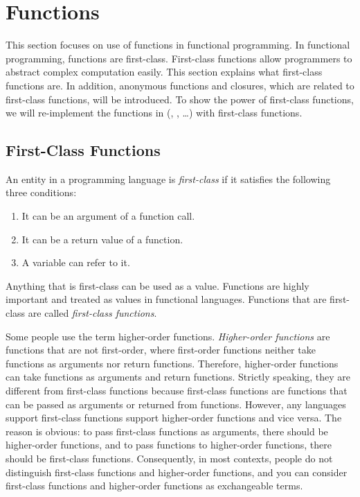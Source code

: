 \setchapterpreamble[u]{\margintoc}
\chapter{Functions}

This section focuses on use of functions in functional programming.
In functional programming, functions are first-class. First-class functions
allow programmers to abstract complex computation easily.
This section explains what first-class functions are.
In addition, anonymous functions and closures, which are related to first-class
functions, will be introduced. To show the power of first-class functions, we
will re-implement the functions in  (,
, \ldots) with first-class functions.

\section{First-Class Functions}

An entity in a programming language is \textit{first-class} if it satisfies the
following three conditions:

\begin{enumerate}
\item It can be an argument of a function call.
\item It can be a return value of a function.
\item A variable can refer to it.
\end{enumerate}

Anything that is first-class can be used as a value. Functions are highly important and
treated as values in functional languages.
Functions that are first-class are called \textit{first-class functions}.

Some people use the term higher-order functions. \textit{Higher-order
functions} are
functions that are not first-order, where first-order functions neither take
functions as arguments nor return functions. Therefore, higher-order functions
can take functions as arguments and return functions. Strictly speaking, they
are different from first-class functions because first-class functions are
functions that can be passed as arguments or returned from functions.
However, any languages support first-class functions support higher-order
functions and vice versa.
The reason is obvious: to pass first-class functions as arguments, there should
be higher-order functions, and to pass functions to higher-order functions,
there should be first-class functions.
Consequently, in most contexts, people do not distinguish
first-class functions and higher-order functions, and you can consider
first-class functions and higher-order functions as exchangeable terms.

